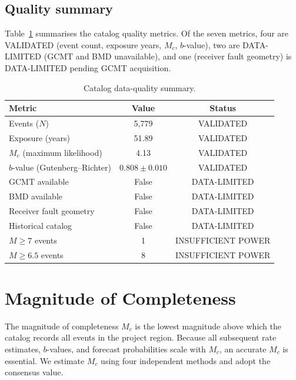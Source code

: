 \documentclass[10pt,a4paper,twocolumn]{article}
\begin{document}
\subsection{Quality summary}

Table~\ref{tab:data-quality} summarises the catalog quality metrics. Of the seven metrics, four are VALIDATED (event count, exposure years, $M_c$, $b$-value), two are DATA-LIMITED (GCMT and BMD unavailable), and one (receiver fault geometry) is DATA-LIMITED pending GCMT acquisition.

\begin{table}[t]
\centering
\caption{Catalog data-quality summary.}\label{tab:data-quality}
\small
\begin{tabular*}{\columnwidth}{@{\extracolsep{\fill}}lcc}
\toprule
Metric & Value & Status \\
\midrule
Events ($N$) & 5{,}779 & VALIDATED \\
Exposure (years) & 51.89 & VALIDATED \\
$M_c$ (maximum likelihood) & 4.13 & VALIDATED \\
$b$-value (Gutenberg--Richter) & $0.808 \pm 0.010$ & VALIDATED \\
GCMT available & False & DATA-LIMITED \\
BMD available & False & DATA-LIMITED \\
Receiver fault geometry & False & DATA-LIMITED \\
Historical catalog & False & DATA-LIMITED \\
$M\geq7$ events & 1 & INSUFFICIENT POWER \\
$M\geq6.5$ events & 8 & INSUFFICIENT POWER \\
\bottomrule
\end{tabular*}
\end{table}

\section{Magnitude of Completeness}\label{sec:mc}

The magnitude of completeness $M_c$ is the lowest magnitude above which the catalog records all events in the project region. Because all subsequent rate estimates, $b$-values, and forecast probabilities scale with $M_c$, an accurate $M_c$ is essential. We estimate $M_c$ using four independent methods and adopt the consensus value.
\end{document}
